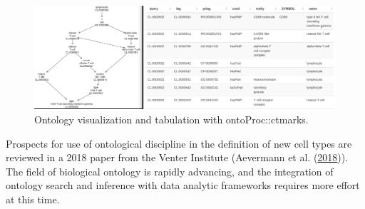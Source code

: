 \begin{figure}
\includegraphics[width=1\linewidth,]{ontoPair} \caption{Ontology visualization and tabulation with ontoProc::ctmarks.}\label{fig:ontopair}
\end{figure}

Prospects for use of ontological discipline in the
definition of new cell types are reviewed in a 2018
paper from the Venter Institute (Aevermann et al. (\protect\hyperlink{ref-Aevermann2018}{2018})).
The field of biological ontology is rapidly advancing,
and the integration of ontology search and inference
with data analytic frameworks requires more effort at this time.

